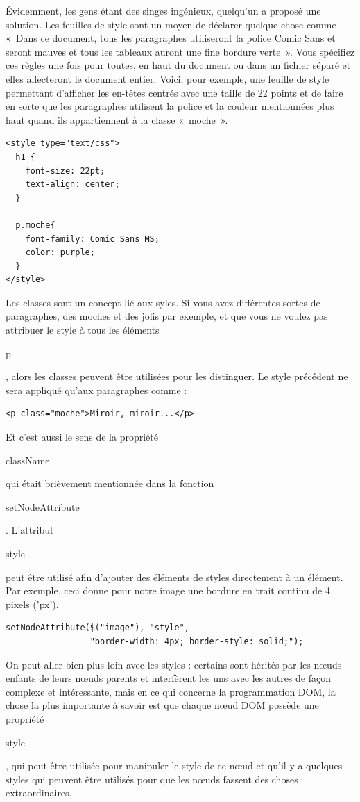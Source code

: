 \documentclass{FramateX}
\renewcommand{\texttt}[1]{\begin{sffamily}{#1}\end{sffamily}}
\begin{document}
Évidemment, les gens étant des singes ingénieux, quelqu'un a proposé une
solution. Les feuilles de style sont un moyen de déclarer quelque chose
comme «~Dans ce document, tous les paragraphes utiliseront la police
Comic Sans et seront mauves et tous les tableaux auront une fine bordure
verte~». Vous spécifiez ces règles une fois pour toutes, en haut du
document ou dans un fichier séparé et elles affecteront le document
entier. Voici, pour exemple, une feuille de style permettant d'afficher
les en-têtes centrés avec une taille de 22 points et de faire en sorte
que les paragraphes utilisent la police et la couleur mentionnées plus
haut quand ils appartiennent à la classe «~moche~».

\begin{lstlisting}
<style type="text/css">
  h1 {
    font-size: 22pt;
    text-align: center;
  }

  p.moche{
    font-family: Comic Sans MS;
    color: purple;
  }
</style>
\end{lstlisting}
Les classes sont un concept lié aux syles. Si vous avez différentes
sortes de paragraphes, des moches et des jolis par exemple, et que vous
ne voulez pas attribuer le style à tous les éléments \texttt{p}, alors
les classes peuvent être utilisées pour les distinguer. Le style
précédent ne sera appliqué qu'aux paragraphes comme :

\begin{lstlisting}
<p class="moche">Miroir, miroir...</p>
\end{lstlisting}
Et c'est aussi le sens de la propriété \texttt{className} qui était
brièvement mentionnée dans la fonction \texttt{setNodeAttribute}.
L'attribut \texttt{style} peut être utilisé afin d'ajouter des éléments
de styles directement à un élément. Par exemple, ceci donne pour notre
image une bordure en trait continu de 4 pixels ('px').

\begin{lstlisting}
setNodeAttribute($("image"), "style",
                 "border-width: 4px; border-style: solid;");
\end{lstlisting}
\begin{center}\end{center}

On peut aller bien plus loin avec les styles : certains sont hérités par
les nœuds enfants de leurs nœuds parents et interfèrent les uns avec les
autres de façon complexe et intéressante, mais en ce qui concerne la
programmation DOM, la chose la plus importante à savoir est que chaque
nœud DOM possède une propriété \texttt{style}, qui peut être utilisée
pour manipuler le style de ce nœud et qu'il y a quelques styles qui
peuvent être utilisés pour que les nœuds fassent des choses
extraordinaires.
\end{document}
